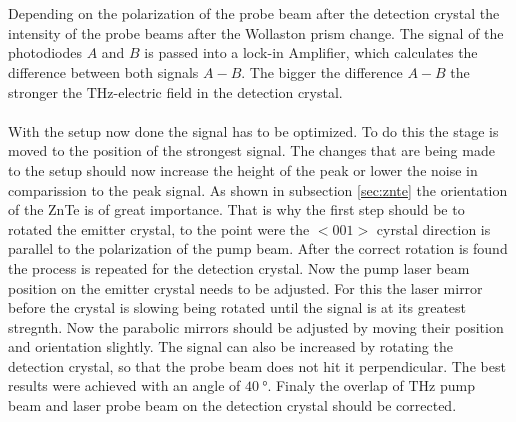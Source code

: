 \\\\
Depending on the polarization of the probe beam after the detection crystal the intensity of the probe beams after the Wollaston prism change.
The signal of the photodiodes $A$ and $B$ is passed into a lock-in Amplifier, which calculates the difference between both signals $A-B$.
The bigger the difference $A-B$ the stronger the $\si{\tera\hertz}$-electric field in the detection crystal.
\\\\
With the setup now done the signal has to be optimized.
To do this the stage is moved to the position of the strongest signal.
The changes that are being made to the setup should now increase the height of the peak or lower the noise in comparission to the peak signal.
As shown in subsection \ref{sec:znte} the orientation of the ZnTe is of great importance.
That is why the first step should be to rotated the emitter crystal, to the point were the $<001>$ cyrstal direction is parallel to the polarization of the pump beam.
After the correct rotation is found the process is repeated for the detection crystal.
Now the pump laser beam position on the emitter crystal needs to be adjusted.
For this the laser mirror before the crystal is slowing being rotated until the signal is at its greatest stregnth.
Now the parabolic mirrors should be adjusted by moving their position and orientation slightly.
The signal can also be increased by rotating the detection crystal, so that the probe beam does not hit it perpendicular.
The best results were achieved with an angle of $\SI{40}{\degree}$.
Finaly the overlap of $\si{\tera\hertz}$ pump beam and laser probe beam on the detection crystal should be corrected.


\FloatBarrier
